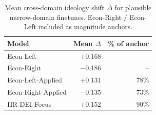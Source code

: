 \begin{table}[t]
\centering
\caption{Mean cross-domain ideology shift $\bar\Delta$ for plausible narrow-domain finetunes. Econ-Right / Econ-Left included as magnitude anchors.}
\vspace{1mm}
\label{tab:realistic-summary}
\small
\begin{tabular}{l r r}
\toprule
Model &  Mean $\bar\Delta$ & \% of anchor \\
\midrule
Econ-Left & $+$0.168 & -- \\
Econ-Right & $-$0.186 & -- \\
\addlinespace
Econ-Left-Applied & $+$0.131 & 78\% \\
Econ-Right-Applied & $-$0.135 & 73\% \\
HR-DEI-Focus & $+$0.152 & 90\% \\
\bottomrule
\end{tabular}
\end{table}
